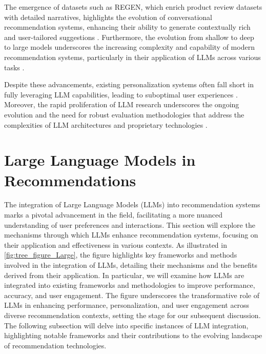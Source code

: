 The emergence of datasets such as REGEN, which enrich product review datasets with detailed narratives, highlights the evolution of conversational recommendation systems, enhancing their ability to generate contextually rich and user-tailored suggestions \cite{bacciu2024generatingqueryrecommendationsllms}. Furthermore, the evolution from shallow to deep to large models underscores the increasing complexity and capability of modern recommendation systems, particularly in their application of LLMs across various tasks \cite{hua2023tutorial}.



Despite these advancements, existing personalization systems often fall short in fully leveraging LLM capabilities, leading to suboptimal user experiences \cite{zhiyuli2023bookgptgeneralframeworkbook}. Moreover, the rapid proliferation of LLM research underscores the ongoing evolution and the need for robust evaluation methodologies that address the complexities of LLM architectures and proprietary technologies \cite{lee2024llm2llmboostingllmsnovel}.













\section{Large Language Models in Recommendations} \label{sec:Large Language Models in Recommendations}

 


The integration of Large Language Models (LLMs) into recommendation systems marks a pivotal advancement in the field, facilitating a more nuanced understanding of user preferences and interactions. This section will explore the mechanisms through which LLMs enhance recommendation systems, focusing on their application and effectiveness in various contexts. As illustrated in \autoref{fig:tree_figure_Large}, the figure highlights key frameworks and methods involved in the integration of LLMs, detailing their mechanisms and the benefits derived from their application. In particular, we will examine how LLMs are integrated into existing frameworks and methodologies to improve performance, accuracy, and user engagement. The figure underscores the transformative role of LLMs in enhancing performance, personalization, and user engagement across diverse recommendation contexts, setting the stage for our subsequent discussion. The following subsection will delve into specific instances of LLM integration, highlighting notable frameworks and their contributions to the evolving landscape of recommendation technologies.

